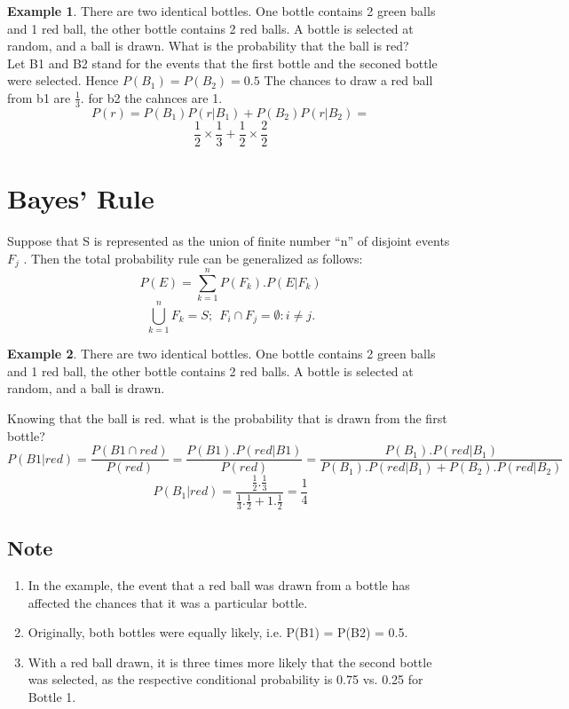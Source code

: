 \documentclass[12pt]{article}
\theoremstyle{definition}
\newtheorem{exmp}{Example}[section]
\begin{document}
\begin{exmp}
There are two identical bottles. One bottle
contains 2 green balls and 1 red ball, the
other bottle contains 2 red balls.
A bottle is selected at random, and a ball
is drawn.
What is the probability that the ball is red?\\


Let B1 and B2 stand for the events that the first bottle and the seconed bottle 
were selected. Hence $P(B_1) = P(B_2) = 0.5$ The chances to draw a red ball from b1 are 
    $\frac{1}{3}$. for b2 the cahnces are 1.
    \[
        P(r)= P(B_1)P(r|B_1) + P(B_2)P(r|B_2) =
    \]
    \[
        \frac{1}{2} \times \frac{1}{3} + \frac{1}{2} \times \frac{2}{2} 
    \]
\end{exmp}
\section{Bayes' Rule}
 Suppose that S is represented as the union of
finite number “n” of disjoint events $F_j$ .
 Then the total probability rule can be generalized as follows:
 \[
     \displaystyle P(E) = \sum_{k=1}^n P(F_k).P(E|F_k)
 \]
 \[
     \bigcup_{k=1}^n F_k = S; \ \ F_i \cap F_j = \emptyset : i \neq j.
 \]

\begin{exmp}
There are two identical bottles. One bottle
contains 2 green balls and 1 red ball, the
other bottle contains 2 red balls.
A bottle is selected at random, and a ball
is drawn.

Knowing that the ball is red. what is the probability that is drawn from the first bottle?
\[
    P(B1|red) = \frac{P(B1 \cap red)}{P(red)} = \frac{P(B1).P(red|B1)}{P(red)} 
    = \frac{P(B_1).P(red|B_1)}{P(B_1).P(red|B_1) + P(B_2).P(red|B_2)} 
\]
\[
    P(B_1|red) = \frac{\frac{1}{2}.\frac{1}{3}}{\frac{1}{3}.\frac{1}{2} + 1.\frac{1}{2}} 
    = \frac{1}{4}
\]
\end{exmp}
\subsection{Note}
\begin{enumerate}
    \item In the example, the event that a red ball was drawn
from a bottle has affected the chances that it was a
particular bottle.
\item Originally, both bottles were equally likely,
i.e. P(B1) = P(B2) = 0.5.
\item With a red ball drawn, it is three times more likely that
the second bottle was selected, as the respective
conditional probability is 0.75 vs. 0.25 for Bottle 1.
\end{enumerate}    
\end{document}
